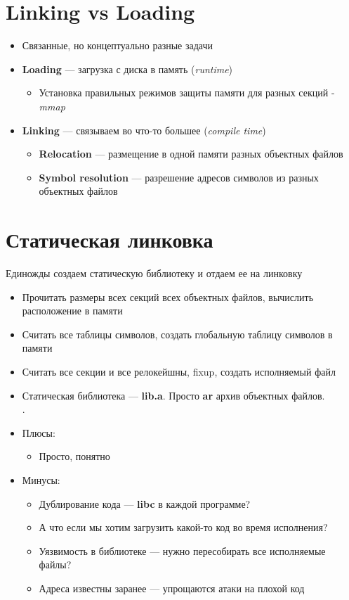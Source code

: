 \documentclass[../../lectures.tex]{subfiles}
\begin{document}
\section{Linking vs Loading}
\begin{itemize}
    \item Связанные, но концептуально разные задачи
    \item \textbf{Loading} --- загрузка с диска в память (\emph{runtime})
        \begin{itemize}
            \item Установка правильных режимов защиты памяти для разных секций - \emph{mmap}
        \end{itemize}
    \item \textbf{Linking} --- связываем во что-то большее (\emph{compile time})
        \begin{itemize}
            \item \textbf{Relocation} --- размещение в одной памяти разных объектных файлов
            \item \textbf{Symbol resolution} --- разрешение адресов символов из разных объектных файлов
        \end{itemize}
\end{itemize}

\section{Статическая линковка}
Единожды создаем статическую библиотеку и отдаем ее на линковку
\begin{itemize}
    \item Прочитать размеры всех секций всех объектных файлов, вычислить расположение в памяти
    \item Считать все таблицы символов, создать глобальную таблицу символов в памяти
    \item Считать все секции и все релокейшны, fixup, создать исполняемый файл
    \item Статическая библиотека --- \textbf{lib.a}. Просто \textbf{ar} архив объектных файлов.\\
          .
    \item Плюсы:
        \begin{itemize}
            \item Просто, понятно
        \end{itemize}
    \item Минусы:
        \begin{itemize}
            \item Дублирование кода --- \textbf{libc} в каждой программе?
            \item А что если мы хотим загрузить какой-то код во время исполнения?
            \item Уязвимость в библиотеке --- нужно пересобирать все исполняемые файлы?
            \item Адреса известны заранее --- упрощаются атаки на плохой код
        \end{itemize}
\end{itemize}
\end{document}
